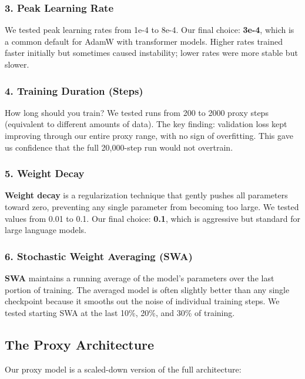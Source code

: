 \documentclass[11pt,a4paper]{article}
\begin{document}
\subsubsection{3. Peak Learning Rate}

We tested peak learning rates from 1e-4 to 8e-4. Our final choice: \textbf{3e-4}, which is a common default for AdamW with transformer models. Higher rates trained faster initially but sometimes caused instability; lower rates were more stable but slower.

\subsubsection{4. Training Duration (Steps)}

How long should you train? We tested runs from 200 to 2000 proxy steps (equivalent to different amounts of data). The key finding: validation loss kept improving through our entire proxy range, with no sign of overfitting. This gave us confidence that the full 20,000-step run would not overtrain.

\subsubsection{5. Weight Decay}

\textbf{Weight decay} is a regularization technique that gently pushes all parameters toward zero, preventing any single parameter from becoming too large. We tested values from 0.01 to 0.1. Our final choice: \textbf{0.1}, which is aggressive but standard for large language models.

\subsubsection{6. Stochastic Weight Averaging (SWA)}

\textbf{SWA} maintains a running average of the model's parameters over the last portion of training. The averaged model is often slightly better than any single checkpoint because it smooths out the noise of individual training steps. We tested starting SWA at the last 10\%, 20\%, and 30\% of training.

\subsection{The Proxy Architecture}

Our proxy model is a scaled-down version of the full architecture:
\end{document}

